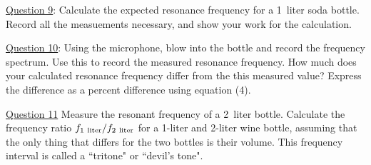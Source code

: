 \documentclass[11pt]{NSF}
\begin{document}
\underline{Question 9}: Calculate the expected resonance frequency for a 
1~liter soda bottle. Record all the measuements necessary, and show your work for the calculation.

\underline{Question 10}: Using the microphone, blow into the bottle and record the frequency spectrum. Use this to record the measured resonance frequency. How much does your calculated resonance frequency differ from the this measured value? Express the difference as a percent difference using equation (4).


\underline{Question 11} Measure the resonant frequency of a 2~liter bottle. Calculate the frequency ratio $f_{\rm 1~liter}/f_{\rm 2~liter}$
for a 1-liter and 2-liter wine bottle, assuming that the only thing 
that differs for the two bottles is their volume.
This frequency interval is called a ``tritone" or ``devil's tone".
\end{document}
